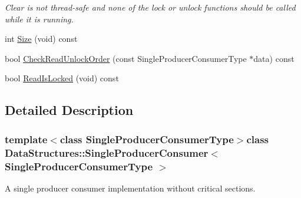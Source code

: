 \begin{DoxyCompactItemize}
\begin{DoxyCompactList}\small\item\em Clear is not thread-\/safe and none of the lock or unlock functions should be called while it is running. \end{DoxyCompactList}\item 
int \hyperlink{class_data_structures_1_1_single_producer_consumer_a4109a63f86171ccd3461082108f6febf}{Size} (void) const 
\item 
bool \hyperlink{class_data_structures_1_1_single_producer_consumer_ab2d92e6bb0d68b8a1974cfd9eac90ed8}{Check\-Read\-Unlock\-Order} (const Single\-Producer\-Consumer\-Type $\ast$data) const 
\item 
bool \hyperlink{class_data_structures_1_1_single_producer_consumer_ad96259b75b794e8451ec29a40018f19d}{Read\-Is\-Locked} (void) const 
\end{DoxyCompactItemize}


\subsection{Detailed Description}
\subsubsection*{template$<$class Single\-Producer\-Consumer\-Type$>$class Data\-Structures\-::\-Single\-Producer\-Consumer$<$ Single\-Producer\-Consumer\-Type $>$}

A single producer consumer implementation without critical sections. 

